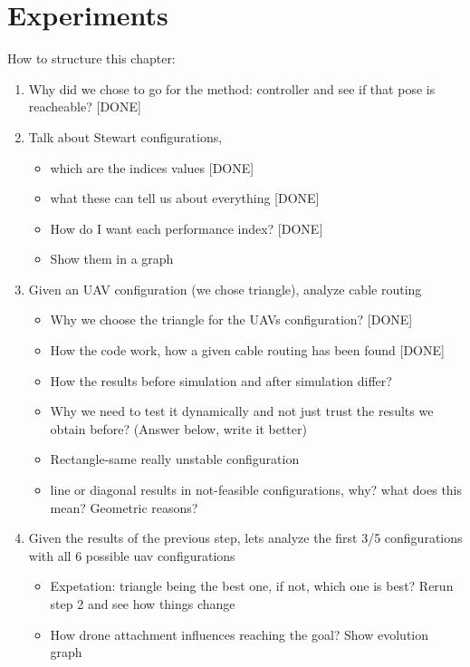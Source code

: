 \chapter{Experiments}

How to structure this chapter:
\begin{enumerate}
    \item Why did we chose to go for the method: controller and see if that pose is reacheable? [DONE] 
    \item Talk about Stewart configurations, 
    \begin{itemize}
        \item which are the indices values [DONE]
        \item what these can tell us about everything [DONE]
        \item How do I want each performance index? [DONE]
        \item Show them in a graph
    \end{itemize}
    \item Given an UAV configuration (we chose triangle), analyze cable routing
    \begin{itemize}
        \item Why we choose the triangle for the UAVs configuration? [DONE]
        \item How the code work, how a given cable routing has been found [DONE]
        \item How the results before simulation and after simulation differ?
        \item Why we need to test it dynamically and not just trust the results we obtain before? (Answer below, write it better)
        \item Rectangle-same really unstable configuration
        \item line or diagonal results in not-feasible configurations, why? what does this mean? Geometric reasons?
    \end{itemize}
    \item Given the results of the previous step, lets analyze the first 3/5 configurations with all 6 possible uav configurations
    \begin{itemize}
        \item Expetation: triangle being the best one, if not, which one is best? Rerun step 2 and see how things change
        \item How drone attachment influences reaching the goal? Show evolution graph

\end{itemize}
\end{enumerate}
